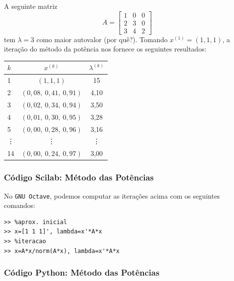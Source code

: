\begin{ex}
  A seguinte matriz
  \begin{equation}
    A =
    \begin{bmatrix}
      1 & 0 & 0\\
      2 & 3 & 0\\
      3 & 4 & 2
    \end{bmatrix}
  \end{equation}
tem $\lambda=3$ como maior autovalor (por quê?). Tomando $x^{(1)} = (1, 1, 1)$, a iteração do método da potência nos fornece os seguintes resultados:
\begin{center}
  \begin{tabular}{l|c|c}
    $k$ & $x^{(k)}$ & $\lambda^{(k)}$\\\hline
    1   & $(1, 1, 1)$ & 15\\
    2   & $(0,08,~0,41,~0,91)$ & 4,10\\
    3   & $(0,02,~0,34,~0,94)$ & 3,50\\
    4   & $(0,01,~0,30,~0,95)$ & 3,28\\
    5   & $(0,00,~0,28,~0,96)$ & 3,16\\
    \vdots & \vdots & \vdots\\
    14  & $(0,00,~0,24,~0,97)$ & 3,00\\\hline
  \end{tabular}
\end{center}

\ifisscilab
\subsubsection{Código Scilab: Método das Potências}


\fi
\ifisoctave
No \verb+GNU Octave+, podemos computar as iterações acima com os seguintes comandos:
\begin{verbatim}
>> %aprox. inicial
>> x=[1 1 1]', lambda=x'*A*x
>> %iteracao
>> x=A*x/norm(A*x), lambda=x'*A*x
\end{verbatim}
\fi
\ifispython
\subsubsection{Código Python: Método das Potências}


\fi
\end{ex}

